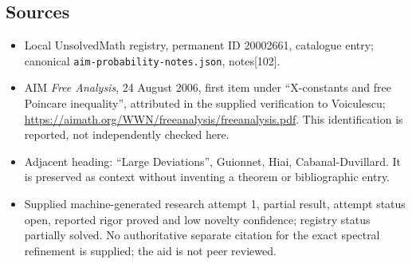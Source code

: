 \documentclass[11pt]{article}
\begin{document}
\subsection{Sources}
\begin{itemize}
\item Local UnsolvedMath registry, permanent ID 20002661, catalogue entry; canonical \texttt{aim-probability-notes.json}, notes[102].
\item AIM \emph{Free Analysis}, 24 August 2006, first item under ``X-constants and free Poincare inequality'', attributed in the supplied verification to Voiculescu; \url{https://aimath.org/WWN/freeanalysis/freeanalysis.pdf}. This identification is reported, not independently checked here.
\item Adjacent heading: ``Large Deviations'', Guionnet, Hiai, Cabanal-Duvillard. It is preserved as context without inventing a theorem or bibliographic entry.
\item Supplied machine-generated research attempt 1, partial result, attempt status open, reported rigor proved and low novelty confidence; registry status partially solved. No authoritative separate citation for the exact spectral refinement is supplied; the aid is not peer reviewed.
\end{itemize}
\end{document}
